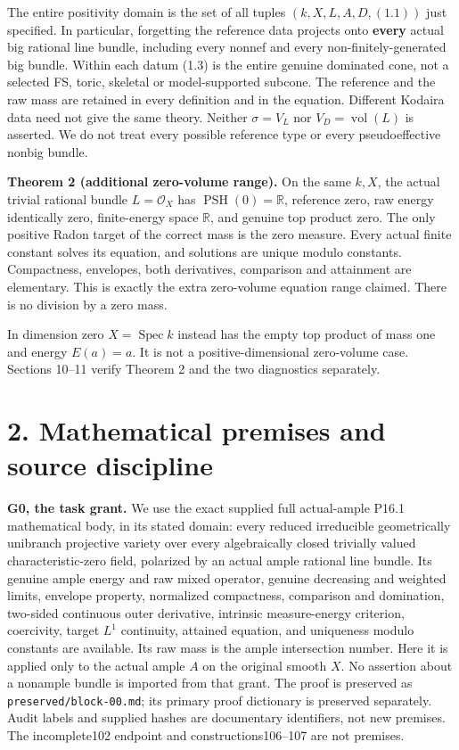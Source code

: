 \documentclass[
  10pt,
]{article}
\begin{document}
The entire positivity domain is the set of all tuples
\((k,X,L,A,D,(1.1))\) just specified. In particular, forgetting the
reference data projects onto \textbf{every} actual big rational line
bundle, including every nonnef and every non-finitely-generated big
bundle. Within each datum (1.3) is the entire genuine dominated cone,
not a selected FS, toric, skeletal or model-supported subcone. The
reference and the raw mass are retained in every definition and in the
equation. Different Kodaira data need not give the same theory. Neither
\(\sigma=V_L\) nor \(V_D=\operatorname{vol}(L)\) is asserted. We do not
treat every possible reference type or every pseudoeffective nonbig
bundle.

\textbf{Theorem 2 (additional zero-volume range).} On the same \(k,X\),
the actual trivial rational bundle \(L=\mathcal O_X\) has
\(\operatorname{PSH}(0)=\mathbb R\), reference zero, raw energy
identically zero, finite-energy space \(\mathbb R\), and genuine top
product zero. The only positive Radon target of the correct mass is the
zero measure. Every actual finite constant solves its equation, and
solutions are unique modulo constants. Compactness, envelopes, both
derivatives, comparison and attainment are elementary. This is exactly
the extra zero-volume equation range claimed. There is no division by a
zero mass.

In dimension zero \(X=\operatorname{Spec}k\) instead has the empty top
product of mass one and energy \(E(a)=a\). It is not a
positive-dimensional zero-volume case. Sections 10--11 verify Theorem 2
and the two diagnostics separately.

\section{2. Mathematical premises and source
discipline}\label{mathematical-premises-and-source-discipline}

\textbf{G0, the task grant.} We use the exact supplied full actual-ample
P16.1 mathematical body, in its stated domain: every reduced irreducible
geometrically unibranch projective variety over every algebraically
closed trivially valued characteristic-zero field, polarized by an
actual ample rational line bundle. Its genuine ample energy and raw
mixed operator, genuine decreasing and weighted limits, envelope
property, normalized compactness, comparison and domination, two-sided
continuous outer derivative, intrinsic measure-energy criterion,
coercivity, target \(L^1\) continuity, attained equation, and uniqueness
modulo constants are available. Its raw mass is the ample intersection
number. Here it is applied only to the actual ample \(A\) on the
original smooth \(X\). No assertion about a nonample bundle is imported
from that grant. The proof is preserved as
\texttt{preserved/block-00.md}; its primary proof dictionary is
preserved separately. Audit labels and supplied hashes are documentary
identifiers, not new premises. The incomplete102 endpoint and
constructions106--107 are not premises.
\end{document}
